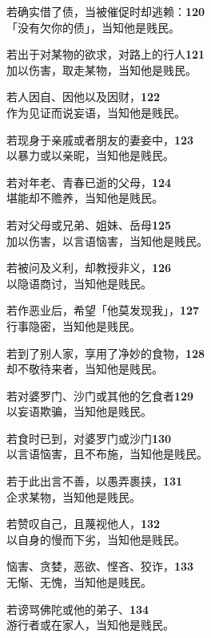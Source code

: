 若确实借了债，当被催促时却逃赖：\hfill{\grayfootnotesize \textbf{120}} \\
「没有欠你的债」，当知他是贱民。


若出于对某物的欲求，对路上的行人\hfill{\grayfootnotesize \textbf{121}} \\
加以伤害，取走某物，当知他是贱民。


若人因自、因他以及因财，\hfill{\grayfootnotesize \textbf{122}} \\
作为见证而说妄语，当知他是贱民。


若现身于亲戚或者朋友的妻妾中，\hfill{\grayfootnotesize \textbf{123}} \\
以暴力或以亲昵，当知他是贱民。


若对年老、青春已逝的父母，\hfill{\grayfootnotesize \textbf{124}} \\
堪能却不赡养，当知他是贱民。


若对父母或兄弟、姐妹、岳母\hfill{\grayfootnotesize \textbf{125}} \\
加以伤害，以言语恼害，当知他是贱民。


若被问及义利，却教授非义，\hfill{\grayfootnotesize \textbf{126}} \\
以隐语商讨，当知他是贱民。


若作恶业后，希望「他莫发现我」，\hfill{\grayfootnotesize \textbf{127}} \\
行事隐密，当知他是贱民。


若到了别人家，享用了净妙的食物，\hfill{\grayfootnotesize \textbf{128}} \\
却不敬待来者，当知他是贱民。


若对婆罗门、沙门或其他的乞食者\hfill{\grayfootnotesize \textbf{129}} \\
以妄语欺骗，当知他是贱民。


若食时已到，对婆罗门或沙门\hfill{\grayfootnotesize \textbf{130}} \\
以言语恼害，且不布施，当知他是贱民。


若于此出言不善，以愚弄裹挟，\hfill{\grayfootnotesize \textbf{131}} \\
企求某物，当知他是贱民。


若赞叹自己，且蔑视他人，\hfill{\grayfootnotesize \textbf{132}} \\
以自身的慢而下劣，当知他是贱民。


恼害、贪婪，恶欲、悭吝、狡诈，\hfill{\grayfootnotesize \textbf{133}} \\
无惭、无愧，当知他是贱民。


若谤骂佛陀或他的弟子、\hfill{\grayfootnotesize \textbf{134}} \\
游行者或在家人，当知他是贱民。


